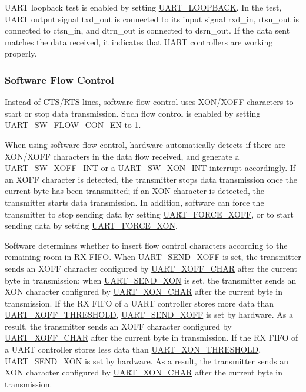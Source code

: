 \documentclass[main\_\_EN.tex]{subfiles}
\begin{document}
UART loopback test is enabled by setting \hyperref[fielddesc:UARTLOOPBACK]{UART\_LOOPBACK}. In the test, UART output signal txd\_out is connected to its input signal rxd\_in, rtsn\_out is connected to ctsn\_in, and dtrn\_out is connected to dsrn\_out. If the data sent matches the data received, it indicates that UART controllers are working properly.

\subsubsection{Software Flow Control}

Instead of CTS/RTS lines, software flow control uses XON/XOFF characters to start or stop data transmission. Such flow control is enabled by setting \hyperref[fielddesc:UARTSWFLOWCONEN]{UART\_SW\_FLOW\_CON\_EN} to 1.

When using software flow control, hardware automatically detects if there are XON/XOFF characters in the data flow received, and generate a UART\_SW\_XOFF\_INT or a UART\_SW\_XON\_INT interrupt accordingly. If an XOFF character is detected, the transmitter stops data transmission once the current byte has been transmitted; if an XON character is detected, the transmitter starts data transmission. In addition, software can force the transmitter to stop sending data by setting \hyperref[fielddesc:UARTFORCEXOFF]{UART\_FORCE\_XOFF}, or to start sending data by setting \hyperref[fielddesc:UARTFORCEXON]{UART\_FORCE\_XON}.

Software determines whether to insert flow control characters according to the remaining room in RX FIFO. When \hyperref[fielddesc:UARTSENDXOFF]{UART\_SEND\_XOFF} is set, the transmitter sends an XOFF character configured by \hyperref[fielddesc:UARTXOFFCHAR]{UART\_XOFF\_CHAR} after the current byte in transmission; when \hyperref[fielddesc:UARTSENDXON]{UART\_SEND\_XON} is set, the transmitter sends an XON character configured by \hyperref[fielddesc:UARTXONCHAR]{UART\_XON\_CHAR} after the current byte in transmission. If the RX FIFO of a UART controller stores more data than \hyperref[fielddesc:UARTXOFFTHRESHOLD]{UART\_XOFF\_THRESHOLD}, \hyperref[fielddesc:UARTSENDXOFF]{UART\_SEND\_XOFF} is set by hardware. As a result, the transmitter sends an XOFF character configured by \hyperref[fielddesc:UARTXOFFCHAR]{UART\_XOFF\_CHAR} after the current byte in transmission. If the RX FIFO of a UART controller stores less data than \hyperref[fielddesc:UARTXONTHRESHOLD]{UART\_XON\_THRESHOLD}, \hyperref[fielddesc:UARTSENDXON]{UART\_SEND\_XON} is set by hardware. As a result, the transmitter sends an XON character configured by \hyperref[fielddesc:UARTXONCHAR]{UART\_XON\_CHAR} after the current byte in transmission.
\end{document}
